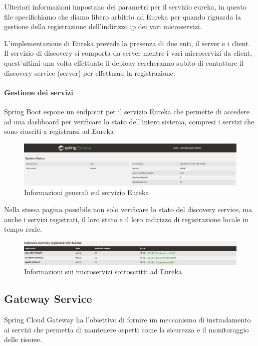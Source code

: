 Ulteriori informazioni impostano dei parametri per il servizio eureka, in questo file specifichiamo che diamo libero arbitrio ad Eureka per quando riguarda la gestione della registrazione dell'indirizzo ip dei vari microservizi.

L'implementazione di Eureka prevede la presenza di due enti, il server e i client. Il servizio di discovery si comporta da server mentre i vari microservizi da client, quest'ultimi una volta effettuato il deploay cercheranno subito di contattare il discovery service (server) per effettuare la registrazione.

\paragraph{Gestione dei servizi}
Spring Boot espone un endpoint per il servizio Eureka che permette di accedere ad una dashboard per verificare lo stato dell'intero sistema, compresi i servizi che sono riusciti a registrarsi ad Eureka

\begin{figure}[h]
    \centering
    \includegraphics[scale=0.20]{capitoli/immagini/13_general_info.png}
    \caption{Informazioni generali sul servizio Eureka}
    \label{fig:General_info}
\end{figure}

Nella stessa pagina possibile non solo verificare lo stato del discovery service, ma anche i servizi registrati, il loro stato e il loro indirizzo di registrazione locale in tempo reale.

\begin{figure}[h]
    \centering
    \includegraphics[scale=0.20]{capitoli/immagini/14_subscribe_services.png}
    \caption{Informazioni sui microservizi sottoscritti ad Eureka}
    \label{fig:Subscribe_Services}
\end{figure}

\subsection{Gateway Service}
Spring Cloud Gateway \cite{gateway} ha l'obiettivo di fornire un meccanismo di instradamento ai servizi che permetta di mantenere aspetti come la sicurezza e il monitoraggio delle risorse.

